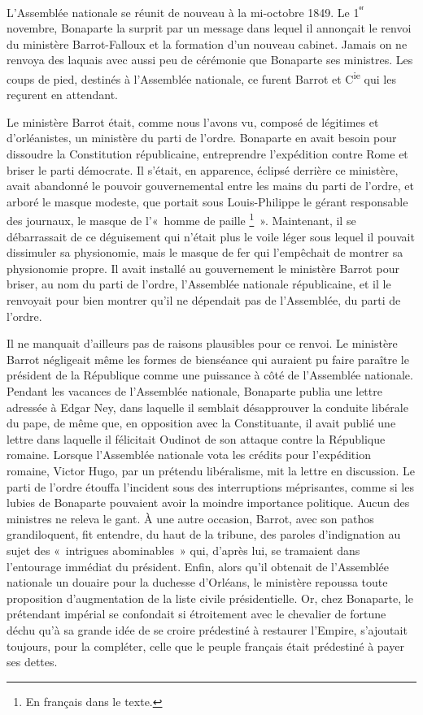 \documentclass[french,twoside]{book} %
\newcommand\chaptercont{} %
\begin{document}
\chaptercont
\noindent L’Assemblée nationale se réunit de nouveau à la mi-octobre 1849. Le 1\textsuperscript{ᵉʳ} novembre, Bonaparte la surprit par un message dans lequel il annonçait le renvoi du ministère Barrot-Falloux et la formation d’un nouveau cabinet. Jamais on ne renvoya des laquais avec aussi peu de cérémonie que Bonaparte ses ministres. Les coups de pied, destinés à l’Assemblée nationale, ce furent Barrot et C\textsuperscript{ie} qui les reçurent en attendant.\par
Le ministère Barrot était, comme nous l’avons vu, composé de légitimes et d’orléanistes, un ministère du parti de l’ordre. Bonaparte en avait besoin pour dissoudre la Constitution républicaine, entreprendre l’expédition contre Rome et briser le parti démocrate. Il s’était, en apparence, éclipsé derrière ce ministère, avait abandonné le pouvoir gouvernemental entre les mains du parti de l’ordre, et arboré le masque modeste, que portait sous Louis-Philippe le gérant responsable des journaux, le masque de l’« homme de paille \footnote{En français dans le texte.} ». Maintenant, il se débarrassait de ce déguisement qui n’était plus le voile léger sous lequel il pouvait dissimuler sa physionomie, mais le masque de fer qui l’empêchait de montrer sa physionomie propre. Il avait installé au gouvernement le ministère Barrot pour briser, au nom du parti de l’ordre, l’Assemblée nationale républicaine, et il le renvoyait pour bien montrer qu’il ne dépendait pas de l’Assemblée, du parti de l’ordre.\par
Il ne manquait d’ailleurs pas de raisons plausibles pour ce renvoi. Le ministère Barrot négligeait même les formes de bienséance qui auraient pu faire paraître le président de la République comme une puissance à côté de l’Assemblée nationale. Pendant les vacances de l’Assemblée nationale, Bonaparte publia une lettre adressée à Edgar Ney, dans laquelle il semblait désapprouver la conduite libérale du pape, de même que, en opposition avec la Constituante, il avait publié une lettre dans laquelle il félicitait Oudinot de son attaque contre la République romaine. Lorsque l’Assemblée nationale vota les crédits pour l’expédition romaine, Victor Hugo, par un prétendu libéralisme, mit la lettre en discussion. Le parti de l’ordre étouffa l’incident sous des interruptions méprisantes, comme si les lubies de Bonaparte pouvaient avoir la moindre importance politique. Aucun des ministres ne releva le gant. À une autre occasion, Barrot, avec son pathos grandiloquent, fit entendre, du haut de la tribune, des paroles d’indignation au sujet des « intrigues abominables » qui, d’après lui, se tramaient dans l’entourage immédiat du président. Enfin, alors qu’il obtenait de l’Assemblée nationale un douaire pour la duchesse d’Orléans, le ministère repoussa toute proposition d’augmentation de la liste civile présidentielle. Or, chez Bonaparte, le prétendant impérial se confondait si étroitement avec le chevalier de fortune déchu qu’à sa grande idée de se croire prédestiné à restaurer l’Empire, s’ajoutait toujours, pour la compléter, celle que le peuple français était prédestiné à payer ses dettes.\par
\end{document}
